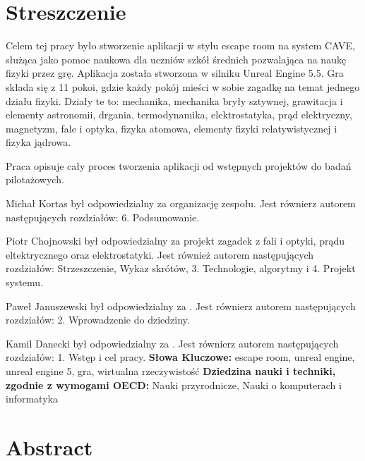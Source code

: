 \chapter*{Streszczenie}
Celem tej pracy było stworzenie aplikacji w stylu escape room na system CAVE, służąca jako pomoc naukowa dla uczniów szkół średnich pozwalająca na naukę fizyki przez grę. Aplikacja została stworzona w silniku Unreal Engine 5.5. Gra składa się z 11 pokoi, gdzie każdy pokój mieści w sobie zagadkę na temat jednego działu fizyki. Działy te to: mechanika, mechanika bryły sztywnej, grawitacja i elementy astronomii, drgania, termodynamika, elektrostatyka, prąd elektryczny, magnetyzm, fale i optyka, fizyka atomowa, elementy fizyki relatywistycznej i fizyka jądrowa.

Praca opisuje cały proces tworzenia aplikacji od wstępnych projektów do badań pilotażowych. 

Michał Kortas był odpowiedzialny za organizację zespołu. Jest równierz autorem następujących rozdziałów: 6. Podsumowanie.

Piotr Chojnowski był odpowiedzialny za projekt zagadek z fali i optyki, prądu eltektrycznego oraz elektrostatyki. Jest również autorem następujących rozdziałów: Strzeszczenie, Wykaz skrótów, 3. Technologie, algorytmy i 4. Projekt systemu.

Paweł Januszewski był odpowiedzialny za . Jest równierz autorem następujących rozdziałów: 2. Wprowadzenie do dziedziny.

Kamil Danecki był odpowiedzialny za . Jest równierz autorem następujących rozdziałów: 1. Wstęp i cel pracy.
\newline
\newline
\textbf{Słowa Kluczowe:} escape room, unreal engine, unreal engine 5, gra, wirtualna rzeczywistość
\newline
\newline
\textbf{Dziedzina nauki i techniki, zgodnie z wymogami OECD:} Nauki przyrodnicze, Nauki o komputerach i informatyka

\chapter*{Abstract}
